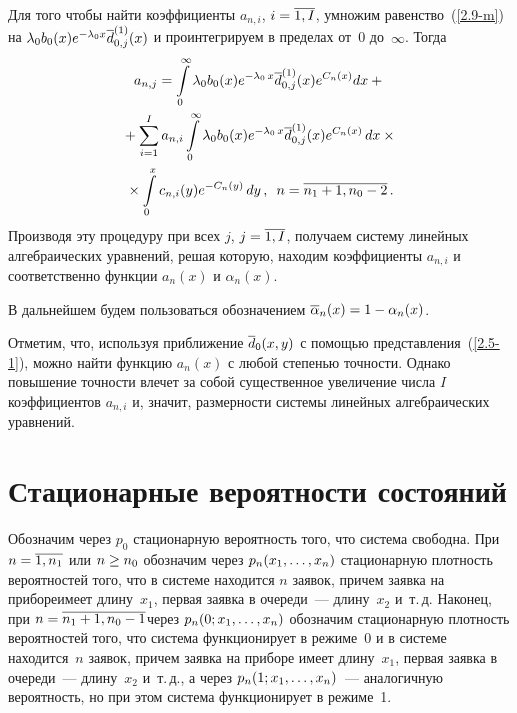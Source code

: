 \begin{multicols}{2}
Для того чтобы найти коэффициенты
$a_{n,i}$, $i\hm=\overline{1,I}$, умножим равенство~(\ref{2.9-m}) на
$\lambda_0 b_0(x) e^{-\lambda_0 x} \overline d^{(1)}_{0,j}(x)$
и проинтегрируем в пределах от~0 до~$\infty$. Тогда
\begin{multline*}
a_{n,j} = \int\limits_0^\infty \lambda_0 b_0(x) e^{-\lambda_0\, x} \overline d^{(1)}_{0,j}(x)
e^{C_n(x)} dx + {}\\
{}+ \sum\limits_{i=1}^I a_{n,i} \int\limits_0^\infty \lambda_0 b_0(x) e^{-\lambda_0\, x} 
\overline d^{(1)}_{0,j}(x) e^{C_n(x)} \,dx\times{}\\
{}\times
\int\limits_0^x c_{n,i}(y) e^{- C_n(y)}  \,dy\,,
\enskip n=\overline{n_1+1,n_0-2}\,.
\end{multline*}
Производя эту процедуру при всех
$j$, $j\hm=\overline{1,I}$, получаем систему линейных
ал\-геб\-ра\-и\-че\-ских уравнений, решая которую,
находим коэффициенты $a_{n,i}$ и соответственно
функции $a_{n}(x)$ и $\alpha_{n}(x)$.

В дальнейшем будем пользоваться обозначением
$\oa_n(x) \hm= 1 - \alpha_n(x)$.


Отметим, что, используя приближение $\overline d_0(x,y)$ с
помощью представления~(\ref{2.5-1}), 
можно найти функцию $a_{n}(x)$ с любой степенью точности.
Однако повышение точности влечет за собой существенное
увеличение числа $I$ коэффициентов $a_{n,i}$ и, 
значит, размерности системы линейных алгебраических уравнений.

\section{Стационарные вероятности состояний}

Обозначим через $p_0$ стационарную вероятность того,
что система свободна.
При $n\hm=\overline{1,n_1}$ или $n\hm\ge n_0$ обозначим через
$p_n(x_1,\ldots,x_n)$ стационарную плот\-ность вероятностей того,
что в системе находится $n$ заявок, причем заявка на
приборе\linebreak имеет длину~$x_1$, первая заявка в очереди~---
длину~$x_2$ и~т.\,д.
Наконец, при $n\hm=\overline{n_1+1,n_0-1}$\linebreak через
$p_n(0;x_1,\ldots,x_n)$ обозначим стационарную плотность
вероятностей того, что система функционирует в режиме~0 и
в системе находится~$n$ заявок, причем заявка на приборе
имеет длину~$x_1$, первая заявка в очереди~--- длину~$x_2$
и~т.\,д., а через $p_n(1;x_1,\ldots,x_n)$~--- аналогичную
вероятность, но при этом система функционирует в режиме~1.


\end{multicols}
